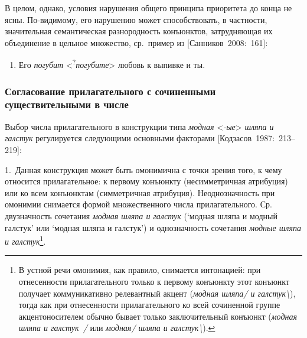 В целом, однако, условия нарушения общего принципа приоритета до конца
не ясны. По-видимому, его нарушению может способствовать, в частности,
значительная семантическая разнородность конъюнктов, затрудняющая их
объединение в цельное множество, ср.~пример из {[}Санников~2008:~161{]}:

\begin{enumerate}
\def\labelenumi{(\arabic{enumi})}
\setcounter{enumi}{126}
\item
  Его \emph{погубит}
  \textless*\textsuperscript{?}\emph{погубите}\textgreater{} любовь к
  выпивке и ты.
\end{enumerate}

\hypertarget{ux441ux43eux433ux43bux430ux441ux43eux432ux430ux43dux438ux435-ux43fux440ux438ux43bux430ux433ux430ux442ux435ux43bux44cux43dux43eux433ux43e-ux441-ux441ux43eux447ux438ux43dux435ux43dux43dux44bux43cux438-ux441ux443ux449ux435ux441ux442ux432ux438ux442ux435ux43bux44cux43dux44bux43cux438-ux432-ux447ux438ux441ux43bux435}{%
\subsubsection{Согласование прилагательного с сочиненными
существительными в
числе}\label{ux441ux43eux433ux43bux430ux441ux43eux432ux430ux43dux438ux435-ux43fux440ux438ux43bux430ux433ux430ux442ux435ux43bux44cux43dux43eux433ux43e-ux441-ux441ux43eux447ux438ux43dux435ux43dux43dux44bux43cux438-ux441ux443ux449ux435ux441ux442ux432ux438ux442ux435ux43bux44cux43dux44bux43cux438-ux432-ux447ux438ux441ux43bux435}}

Выбор числа прилагательного в конструкции типа \emph{модная}
\textless{}\emph{-ые}\textgreater{} \emph{шляпа и галстук} регулируется
следующими основными факторами {[}Кодзасов~1987:~213--219{]}:

1.~Данная конструкция может быть омонимична с точки зрения того, к чему
относится прилагательное: к первому конъюнкту (несимметричная атрибуция)
или ко всем конъюнктам (симметричная атрибуция). Неоднозначность при
омонимии снимается формой множественного числа прилагательного. Ср.
двузначность сочетания \emph{модная шляпа и галстук} (`модная шляпа и
модный галстук' или `модная шляпа и галстук') и однозначность сочетания
\emph{модные шляпа и галстук}\footnote{В устной речи омонимия, как
  правило, снимается интонацией: при отнесенности прилагательного только
  к первому конъюнкту этот конъюнкт получает коммуникативно релевантный
  акцент (\emph{модная шляпа/ и галстук\textbackslash{}}), тогда как при
  отнесенности прилагательного ко всей сочиненной группе
  акцентоносителем обычно бывает только заключительный конъюнкт
  (\emph{модная шляпа и галстук~/} или \emph{модная/ шляпа и
  галстук\textbackslash{}}).}.

